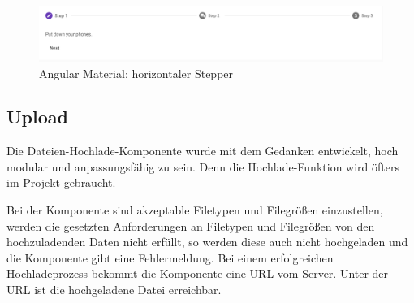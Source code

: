 \begin{figure}
    \centering
    \includegraphics[scale=0.5]{pics/mathorziontalstepper.png}
    \caption{Angular Material: horizontaler Stepper \cite{amStepper}}
    \label{fig:impl:creation:mathorziontalstepper}
\end{figure}

\subsection{Upload}
\label{sec:wizard:upload}
Die Dateien-Hochlade-Komponente wurde mit dem Gedanken entwickelt, hoch modular und anpassungsfähig zu sein. Denn die Hochlade-Funktion wird öfters im Projekt gebraucht.

Bei der Komponente sind akzeptable Filetypen und Filegrößen einzustellen, werden die gesetzten Anforderungen an Filetypen und Filegrößen von den hochzuladenden Daten nicht erfüllt, so werden diese auch nicht hochgeladen und die Komponente gibt eine Fehlermeldung.
Bei einem erfolgreichen Hochladeprozess bekommt die Komponente eine URL vom Server. Unter der URL ist die hochgeladene Datei erreichbar.

